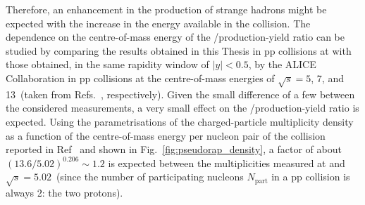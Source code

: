 Therefore, an enhancement in the production of strange hadrons might be expected with the increase in the energy available in the collision. The dependence on the centre-of-mass energy of the \ds/\dpl production-yield ratio can be studied by comparing the results obtained in this Thesis in pp collisions at \thirteen with those obtained, in the same rapidity window of \mbox{$\lvert y\rvert<0.5$}, by the ALICE Collaboration in pp collisions at the centre-of-mass energies of $\sqrt{s} = 5$, 7, and 13~\tev (taken from Refs.~\cite{ALICE:2021mgk,ALICE:2017olh,ALICE:2023sgl}, respectively). Given the small difference of a few \tev between the considered measurements, a very small effect on the \ds/\dpl production-yield ratio is expected. Using the parametrisations of the charged-particle multiplicity density as a function of the centre-of-mass energy per nucleon pair of the collision reported in Ref~\cite{ALICE:2015juo} and shown in Fig.~\ref{fig:pseudorap_density}, a factor of about $(13.6/5.02)^{0.206} \sim 1.2$ is expected between the multiplicities measured at \thirteen and $\sqrt{s} = 5.02$~\tev (since the number of participating nucleons $N_\mathrm{part}$ in a pp collision is always 2: the two protons). 

